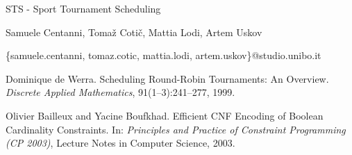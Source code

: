 \documentclass{article}
\date{September 2025}
\begin{document}
    \begin{titlepage}
        \begin{center}
            {\LARGE STS - Sport Tournament Scheduling }
            \vspace*{1em}
            
            Samuele Centanni, Tomaž Cotič, Mattia Lodi, Artem Uskov

            \centerline{\{samuele.centanni, tomaz.cotic, mattia.lodi, artem.uskov\}@studio.unibo.it}
        \end{center}
    \end{titlepage}

  

     
    


\begin{thebibliography}{9}

Dominique de Werra.
\newblock Scheduling Round-Robin Tournaments: An Overview.
\newblock \emph{Discrete Applied Mathematics}, 91(1–3):241--277, 1999.

Olivier Bailleux and Yacine Boufkhad.
\newblock Efficient CNF Encoding of Boolean Cardinality Constraints.
\newblock In: \emph{Principles and Practice of Constraint Programming (CP 2003)}, Lecture Notes in Computer Science, 2003.
\end{thebibliography}
\end{document}
